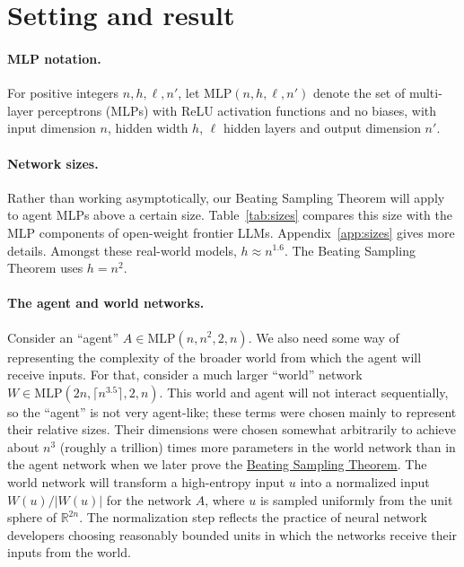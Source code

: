 \documentclass[10pt]{article}
\newcommand{\bst}{\hyperref[thm:main]{Beating Sampling Theorem}}
\newcommand{\RR}{\mathbb{R}}
\begin{document}
\section{Setting and result}\label{sec:setting}

\paragraph{MLP notation.} For positive integers $n,h,\ell,n'$, let $\mathrm{MLP}(n,h,\ell,n')$ denote the set of multi-layer perceptrons (MLPs) with ReLU activation functions and no biases, with input dimension $n$, hidden width $h$, $\ell$ hidden layers and output dimension $n'$.

\paragraph{Network sizes.} Rather than working asymptotically, our Beating Sampling Theorem will apply to agent MLPs above a certain size.  Table~\ref{tab:sizes} compares this size with the MLP components of open-weight frontier LLMs. Appendix~\ref{app:sizes} gives more details. Amongst these real-world models, $h\approx n^{1.6}$. The Beating Sampling Theorem uses $h=n^2$.

\begin{table}[h]
\centering\small
\sizestable
\caption{The agent and world networks of the \bst{} at $n=8{,}000$, and the MLP
blocks of large open-weight transformers. For a mixture-of-experts layer,
$h$ is the total width of its routed experts. The last column counts the
parameters of the whole model; see Appendix~\ref{app:sizes}.}
\label{tab:sizes}
\end{table}

\paragraph{The agent and world networks.}  Consider an ``agent'' $A\in\mathrm{MLP}(n,n^2,2,n)$.  We also need some way of representing the complexity of the broader world from which the agent will receive inputs.  For that, consider a much larger ``world'' network $W\in\mathrm{MLP}(2n,\lceil n^{3.5}\rceil,2,n)$.  This world and agent will not interact sequentially, so the ``agent'' is not very agent-like; these terms were chosen mainly to represent their relative sizes.  Their dimensions were chosen somewhat arbitrarily to achieve about $n^3$ (roughly a trillion) times more parameters in the world network than in the agent network when we later prove the \bst{}.  The world network will transform a high-entropy input $u$ into a normalized input $W(u)/|W(u)|$ for the network $A$, where $u$ is sampled uniformly from the unit sphere of $\RR^{2n}$.  The normalization step reflects the practice of neural network developers choosing reasonably bounded units in which the networks receive their inputs from the world.
\end{document}
